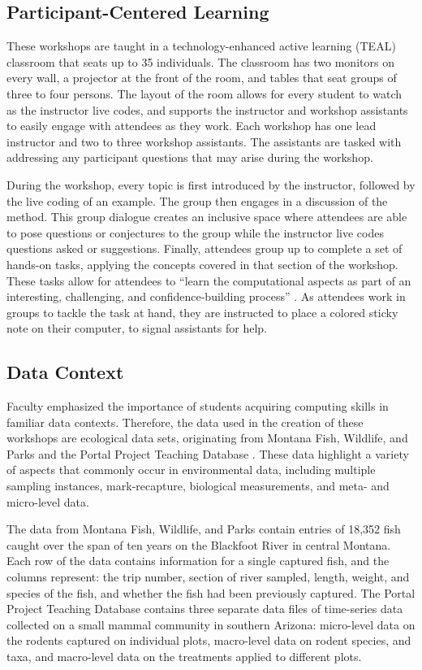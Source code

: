 \documentclass[12pt]{article}
\begin{document}
\subsection{Participant-Centered Learning}  

\quad These workshops are taught in a technology-enhanced active learning (TEAL) classroom that seats up to 35 individuals. The classroom has two monitors on every wall, a projector at the front of the room, and tables that seat groups of three to four persons. The layout of the room allows for every student to watch as the instructor live codes, and supports the instructor and workshop assistants to easily engage with attendees as they work. Each workshop has one lead instructor and two to three workshop assistants. The assistants are tasked with addressing any participant questions that may arise during the workshop.  

\quad During the workshop, every topic is first introduced by the instructor, followed by the live coding of an example. The group then engages in a discussion of the method. This group dialogue creates an inclusive space where attendees are able to pose questions or conjectures to the group while the instructor live codes questions asked or suggestions. Finally, attendees group up to complete a set of hands-on tasks, applying the concepts covered in that section of the workshop. These tasks allow for attendees to ``learn the computational aspects as part of an interesting, challenging, and confidence-building process'' \citep[p. 101]{nolan}. As attendees work in groups to tackle the task at hand, they are instructed to place a colored sticky note on their computer, to signal assistants for help.    

\subsection{Data Context}  
\quad Faculty emphasized the importance of students acquiring computing skills in familiar data contexts. Therefore, the data used in the creation of these workshops are ecological data sets, originating from Montana Fish, Wildlife, and Parks and the Portal Project Teaching Database \citep{portal_data}. These data highlight a variety of aspects that commonly occur in environmental data, including multiple sampling instances, mark-recapture, biological measurements, and meta- and micro-level data. 

\quad The data from Montana Fish, Wildlife, and Parks contain entries of 18,352 fish caught over the span of ten years on the Blackfoot River in central Montana. Each row of the data contains information for a single captured fish, and the columns represent: the trip number, section of river sampled, length, weight, and species of the fish, and whether the fish had been previously captured. The Portal Project Teaching Database contains three separate data files of time-series data collected on a small mammal community in southern Arizona: micro-level data on the rodents captured on individual plots, macro-level data on rodent species, and taxa, and macro-level data on the treatments applied to different plots. 
\end{document}
